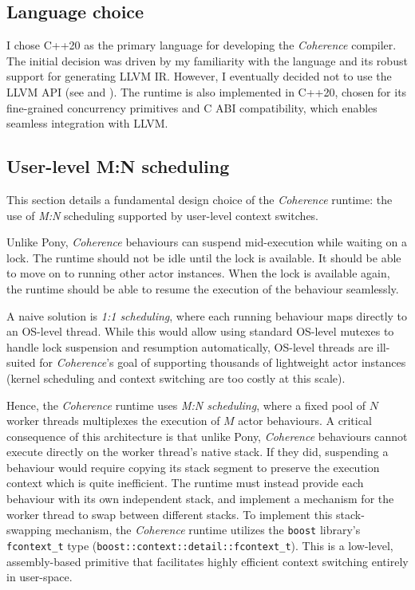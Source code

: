 \subsection{Language choice}
I chose C++20 as the primary language for developing the \textit{Coherence} compiler. The initial decision was driven by my familiarity with the language and its robust support for generating LLVM IR. However, I eventually decided not to use the LLVM API (see  and ). The runtime is also implemented in C++20, chosen for its fine-grained concurrency primitives and C ABI compatibility, which enables seamless integration with LLVM.

\subsection{User-level M:N scheduling} \label{sec:preparation_runtime}
This section details a fundamental design choice of the \textit{Coherence} runtime: the use of \textit{M:N} scheduling supported by user-level context switches. 

Unlike Pony, \textit{Coherence} behaviours can suspend mid-execution while waiting on a lock. The runtime should not be idle until the lock is available. It should be able to move on to running other actor instances. When the lock is available again, the runtime should be able to resume the execution of the behaviour seamlessly.

A naive solution is \textit{1:1 scheduling}, where each running behaviour maps directly to an OS-level thread. While this would allow using standard OS-level mutexes to handle lock suspension and resumption automatically, OS-level threads are ill-suited for \textit{Coherence}'s goal of supporting thousands of lightweight actor instances (kernel scheduling and context switching are too costly at this scale). %

Hence, the \textit{Coherence} runtime uses \textit{M:N scheduling}, where a fixed pool of $N$ worker threads multiplexes the execution of $M$ actor behaviours. A critical consequence of this architecture is that unlike Pony, \textit{Coherence} behaviours cannot execute directly on the worker thread's native stack. If they did, suspending a behaviour would require copying its stack segment to preserve the execution context which is quite inefficient. The runtime must instead provide each behaviour with its own independent stack, and implement a mechanism for the worker thread to swap between different stacks. To implement this stack-swapping mechanism, the \textit{Coherence} runtime utilizes the \texttt{boost} library's \texttt{fcontext\_t} type (\texttt{boost::context::detail::fcontext\_t}). This is a low-level, assembly-based primitive that facilitates highly efficient context switching entirely in user-space.


